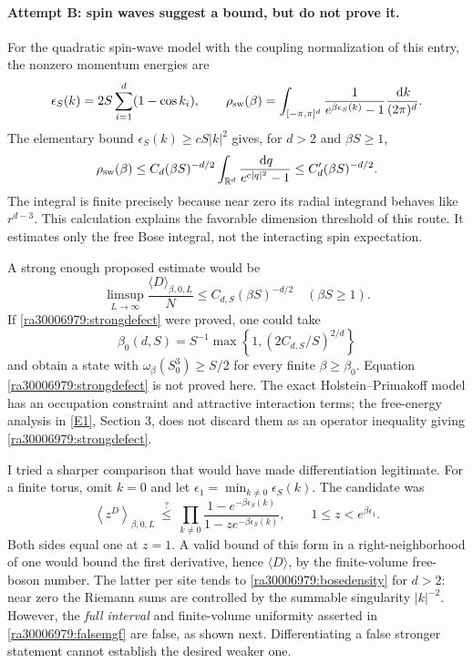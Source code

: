 \documentclass[11pt]{article}
\newcommand{\R}{\mathbb{R}}
\newcommand{\dd}{\,\mathrm d}
\newcommand{\eref}[2]{\hyperlink{extra:#1:#2}{[E#2]}}
\begin{document}
	\paragraph{Attempt B: spin waves suggest a bound, but do not prove it.}
	For the quadratic spin-wave model with the coupling normalization of
	this entry, the nonzero momentum energies are
	\[
	\epsilon_S(k)=2S\sum_{i=1}^d(1-\cos k_i),\qquad
	\rho_{\rm sw}(\beta)=
	\int_{[-\pi,\pi]^d}\frac{1}{e^{\beta\epsilon_S(k)}-1}
	\frac{\dd k}{(2\pi)^d}.
	\]
	The elementary bound $\epsilon_S(k)\geq cS|k|^2$ gives, for $d>2$ and
	$\beta S\geq1$,
	\begin{equation}\label{ra30006979:bosedensity}
		\rho_{\rm sw}(\beta)
		\leq C_d(\beta S)^{-d/2}
		\int_{\R^d}\frac{\dd q}{e^{c|q|^2}-1}
		\leq C_d'(\beta S)^{-d/2}.
	\end{equation}
	The integral is finite precisely because near zero its radial
	integrand behaves like $r^{d-3}$. This calculation explains the
	favorable dimension threshold of this route. It estimates only the
	free Bose integral, not the interacting spin expectation.
	
	A strong enough proposed estimate would be
	\begin{equation}\label{ra30006979:strongdefect}
		\limsup_{L\to\infty}\frac{\langle D\rangle_{\beta,0,L}}{N}
		\leq C_{d,S}(\beta S)^{-d/2}
		\quad(\beta S\geq1). \tag{SD}
	\end{equation}
	If \eqref{ra30006979:strongdefect} were proved, one could take
	\[
	\beta_0(d,S)=S^{-1}\max\left\{1,
	(2C_{d,S}/S)^{2/d}\right\}
	\]
	and obtain a state with $\omega_\beta(S_0^3)\geq S/2$ for every finite
	$\beta\geq\beta_0$. Equation \eqref{ra30006979:strongdefect} is not proved
	here. The exact Holstein--Primakoff model has an occupation constraint
	and attractive interaction terms; the free-energy analysis in
	\eref{30006979}{1}, Section 3, does not discard them as an operator
	inequality giving \eqref{ra30006979:strongdefect}.
	
	I tried a sharper comparison that would have made differentiation
	legitimate. For a finite torus, omit $k=0$ and let
	$\epsilon_1=\min_{k\ne0}\epsilon_S(k)$. The candidate was
	\begin{equation}\label{ra30006979:falsemgf}
		\left\langle z^D\right\rangle_{\beta,0,L}
		\ \stackrel{?}{\leq}\
		\prod_{k\ne0}\frac{1-e^{-\beta\epsilon_S(k)}}
		{1-ze^{-\beta\epsilon_S(k)}},
		\qquad 1\leq z<e^{\beta\epsilon_1}.
	\end{equation}
	Both sides equal one at $z=1$. A valid bound of this form in a
	right-neighborhood of one would bound the first derivative, hence
	$\langle D\rangle$, by the finite-volume free-boson number. The latter
	per site tends to \eqref{ra30006979:bosedensity} for $d>2$: near zero the
	Riemann sums are controlled by the summable singularity $|k|^{-2}$.
	However, the \emph{full interval} and finite-volume uniformity asserted
	in \eqref{ra30006979:falsemgf} are false, as shown next. Differentiating a
	false stronger statement cannot establish the desired weaker one.
	
\end{document}

